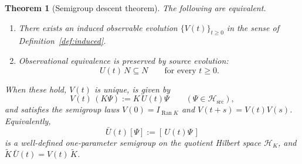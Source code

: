 \documentclass[11pt,reqno]{amsart}
\numberwithin{equation}{section}
\theoremstyle{plain}
\newtheorem{theorem}{Theorem}[section]
\theoremstyle{definition}
\theoremstyle{remark}
\newcommand{\Hsrc}{\mathcal{H}_{\mathrm{src}}}
\newcommand{\HK}{\mathcal{H}_{K}}
\newcommand{\Ran}{\operatorname{Ran}}
\newcommand{\Kt}{\widetilde{K}}
\begin{document}
\begin{theorem}[Semigroup descent theorem]
\label{thm:semigroup}
The following are equivalent.
\begin{enumerate}
\item There exists an induced observable evolution $\{V(t)\}_{t\ge0}$ in the sense of
Definition~\ref{def:induced}.
\item Observational equivalence is preserved by source evolution:
\begin{equation}
\label{eq:invariance}
U(t)\,N\subseteq N
\qquad\text{for every }t\ge0 .
\end{equation}
\end{enumerate}
When these hold, $V(t)$ is unique, is given by
\begin{equation}
\label{eq:Vdef}
V(t)\,(K\Psi):=K\,U(t)\Psi
\qquad(\Psi\in\Hsrc),
\end{equation}
and satisfies the semigroup laws $V(0)=I_{\Ran K}$ and $V(t+s)=V(t)V(s)$. Equivalently,
\begin{equation}
\label{eq:Ubar}
\bar U(t)[\Psi]:=[\,U(t)\Psi\,]
\end{equation}
is a well-defined one-parameter semigroup on the quotient Hilbert space $\HK$, and
$\Kt\,\bar U(t)=V(t)\,\Kt$.
\end{theorem}
\end{document}
